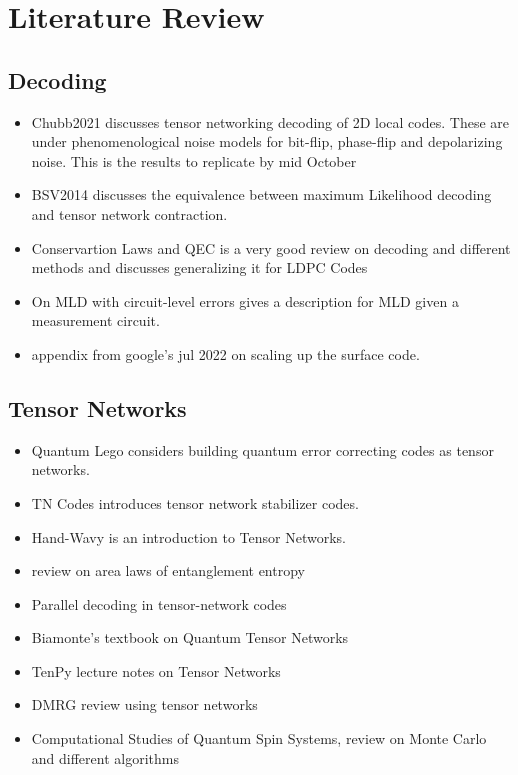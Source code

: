 \chapter{Literature Review}\label{ch: literature review}

\section{Decoding}\label{sec: decoding-lit-rev}
\begin{itemize}
    \item Chubb2021\cite{Chubb2021-se} discusses tensor networking decoding of 2D local codes. These are under phenomenological noise models for bit-flip, phase-flip and depolarizing noise. This is the results to replicate by mid October
    \item  BSV2014\cite{Bravyi2014-kw} discusses the equivalence between maximum Likelihood decoding and tensor network contraction.
    \item Conservartion Laws and QEC\cite{Brown2022-hg} is a very good review on decoding and different methods and discusses generalizing it for LDPC Codes
    \item On MLD with circuit-level errors\cite{Pryadko2019-bg} gives a description for MLD given a measurement circuit.
    \item appendix from google's jul 2022\cite{Acharya2022-ev} on scaling up the surface code.
\end{itemize}


\section{Tensor Networks}\label{sec: tensor-networks-lit-rev}
\begin{itemize}
    \item Quantum Lego\cite{Cao2022-xf} considers building quantum error correcting codes as tensor networks.
    \item TN Codes\cite{Farrelly2021-da} introduces tensor network stabilizer codes.
    \item Hand-Wavy\cite{Bridgeman2017-rk} is an introduction to Tensor Networks.
    \item review on area laws of entanglement entropy\cite{Eisert2010-pq}
    \item Parallel decoding in tensor-network codes\cite{Farrelly2022-yz} 
    \item Biamonte's textbook on Quantum Tensor Networks\cite{Biamonte2019-xf}
    \item TenPy lecture notes on  Tensor Networks\cite{Hauschild2018-lu}
    \item DMRG review using tensor networks\cite{Schollwoeck2010-uf}
    \item Computational Studies of Quantum Spin Systems, review on Monte Carlo and different algorithms\cite{Sandvik2011-md}
\end{itemize}

